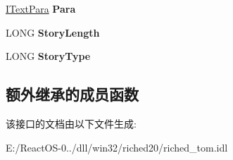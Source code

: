 \begin{DoxyCompactItemize}
\item 
\mbox{\label{interfacetom_1_1_i_text_range_ab979e52f714ad650faff64f8470d5d6e}} 
\hyperlink{interfacetom_1_1_i_text_para}{I\+Text\+Para} {\bfseries Para}
\item 
\mbox{\label{interfacetom_1_1_i_text_range_a34579c6225f6a8bec1f84d4907fb01f8}} 
L\+O\+NG {\bfseries Story\+Length}
\item 
\mbox{\label{interfacetom_1_1_i_text_range_a872efdd885705038e5e1e08d19b85696}} 
L\+O\+NG {\bfseries Story\+Type}
\end{DoxyCompactItemize}
\subsection*{额外继承的成员函数}


该接口的文档由以下文件生成\+:\begin{DoxyCompactItemize}
\item 
E\+:/\+React\+O\+S-\/0../dll/win32/riched20/riched\+\_\+tom.\+idl\end{DoxyCompactItemize}
